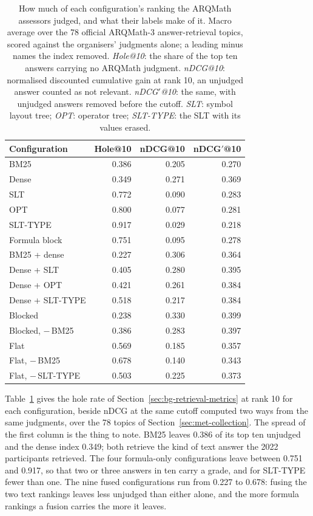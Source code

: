 \begin{table}[!ht]
\centering
\small
\renewcommand{\arraystretch}{1.15}
\begin{tabular}{lrrr}
\toprule
Configuration & Hole@10 & nDCG@10 & nDCG$'$@10 \\
\midrule
BM25                  & 0.386 & 0.205 & 0.270 \\
Dense                 & 0.349 & 0.271 & 0.369 \\
\addlinespace
SLT                   & 0.772 & 0.090 & 0.283 \\
OPT                   & 0.800 & 0.077 & 0.281 \\
SLT-TYPE              & 0.917 & 0.029 & 0.218 \\
Formula block         & 0.751 & 0.095 & 0.278 \\
\addlinespace
BM25 + dense          & 0.227 & 0.306 & 0.364 \\
Dense + SLT           & 0.405 & 0.280 & 0.395 \\
Dense + OPT           & 0.421 & 0.261 & 0.384 \\
Dense + SLT-TYPE      & 0.518 & 0.217 & 0.384 \\
Blocked               & 0.238 & 0.330 & 0.399 \\
Blocked, $-$\,BM25    & 0.386 & 0.283 & 0.397 \\
Flat                  & 0.569 & 0.185 & 0.357 \\
Flat, $-$\,BM25       & 0.678 & 0.140 & 0.343 \\
Flat, $-$\,SLT-TYPE   & 0.503 & 0.225 & 0.373 \\
\bottomrule
\end{tabular}
\caption[Unjudged answers under the ARQMath labels]{How much of each configuration's ranking the ARQMath assessors judged, and
what their labels make of it. Macro average over the 78 official ARQMath-3 answer-retrieval topics,
scored against the organisers' judgments alone; a leading minus names the index removed.
\emph{Hole@10}: the share of the top ten answers carrying no ARQMath judgment. \emph{nDCG@10}:
normalised discounted cumulative gain at rank 10, an unjudged answer counted as not relevant.
\emph{nDCG$'$@10}: the same, with unjudged answers removed before the cutoff. \emph{SLT}: symbol
layout tree; \emph{OPT}: operator tree; \emph{SLT-TYPE}: the SLT with its values erased.}
\label{tab:ret-holes}
\end{table}

Table~\ref{tab:ret-holes} gives the hole rate of
Section~\ref{sec:bg-retrieval-metrics} at rank 10 for each configuration, beside nDCG at
the same cutoff computed two ways from the same judgments, over the 78 topics of
Section~\ref{sec:met-collection}. The spread of the first column is the thing to note.
BM25 leaves 0.386 of its top ten unjudged and the dense index 0.349; both retrieve the
kind of text answer the 2022 participants retrieved. The four formula-only configurations
leave between 0.751 and 0.917, so that two or three answers in ten carry a grade, and for
SLT-TYPE fewer than one. The nine fused configurations run from 0.227 to 0.678: fusing the
two text rankings leaves less unjudged than either alone, and the more formula rankings a
fusion carries the more it leaves.

